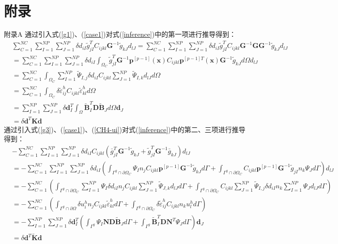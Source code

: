 \chapter{附录}
附录A
通过引入式(\ref{g1})、(\ref{case1})对式(\ref{inference})中的第一项进行推导得到：
\begin{equation}\label{CH4-K}
\begin{split}
    &\sum_{C=1}^{N\!C}\sum_{I=1}^{N\!P}\sum_{J=1}^{N\!P}\delta d_{iI}\tilde{g}^T_{jI}C_{ijkl}\pmb{G}^{-1}\tilde{g}_{kJ}d_{lJ}=\sum_{C=1}^{N\!C}\sum_{I=1}^{N\!P}\sum_{J=1}^{N\!P}\delta d_{iI}\tilde{g}^T_{jI}C_{ijkl}\pmb{G}^{-1}\pmb{G}\pmb{G}^{-1}\tilde{g}_{kJ}d_{lJ}\\
&=\sum_{C=1}^{N\!C}\sum_{I=1}^{N\!P}\sum_{J=1}^{N\!P}\delta d_{iI}\int_{\Omega_C}\tilde{g}_{jI}^T\pmb{G}^{-1}\pmb{p}^{[p-1]}(\pmb x)C_{ijkl}\pmb{p}^{[p-1]T}(\pmb{x})\pmb{G}^{-1}\tilde{g}_{kJ}d\Omega d_{lJ}\\
&=\sum_{C=1}^{N\!C}\int_{\Omega_C}\sum_{I=1}^{N\!P}\tilde{\Psi}_{I,j}\delta d_{iI}C_{ijkl}\sum_{J=1}^{N\!P}\tilde{\Psi}_{I,k}d_{lJ}d\Omega\\
&=\sum_{C=1}^{N\!C}\int_{\Omega_C}\delta\tilde{\varepsilon}_{ij}^hC_{ijkl}\tilde{\varepsilon}_{kl}^hd\Omega\\
&=\sum_{I=1}^{N\!P}\sum_{J=1}^{N\!P}\delta\pmb{d}^T_I\int_{\Omega}\tilde{\pmb{B}}_I^T\pmb{D}\tilde{\pmb{B}}_Jd\Omega\pmb{d}_J\\
&=\delta\pmb{d}^T\pmb{K}\pmb{d}
\end{split}
\end{equation}
通过引入式(\ref{g3})、(\ref{case1})、(\ref{CH4-ui})对式(\ref{inference})中的第二、三项进行推导得到：
\begin{equation}\label{CH4-tildeK}
\begin{split}
    &-\sum_{C=1}^{N\!C}\sum_{I=1}^{N\!P}\sum_{J=1}^{N\!P}\delta d_{iI}C_{ijkl}(\bar{g}_{jI}^T\pmb{G}^{-1}\tilde{g}_{kJ}+\tilde{g}_{jI}^T\pmb{G}^{-1}\bar{g}_{kJ})d_{lJ}\\
    &=-\sum_{C=1}^{N\!C}\sum_{I=1}^{N\!P}\sum_{J=1}^{N\!P}\delta d_{iI}(\int_{\Gamma^g\cap\partial\Omega_C}\Psi_In_jC_{ijkl}\pmb{p}^{[p-1]}\pmb{G}^{-1}\tilde{g}_{kJ}d\Gamma+\int_{\Gamma^g\cap\partial\Omega_C}C_{ijkl}\pmb{p}^{[p-1]}\pmb{G}^{-1}\tilde{g}_{jI}n_k\Psi_Jd\Gamma)d_{lJ}\\
    &=-\sum_{C=1}^{N\!C}(\int_{\Gamma^g\cap\partial\Omega_C}\sum_{I=1}^{N\!P}\Psi_I\delta d_{iI}n_jC_{ijkl}\sum_{J=1}^{N\!P}\tilde{\Psi}_{J,k}d_{lJ}d\Gamma+\int_{\Gamma^g\cap\partial\Omega_C}C_{ijkl}\sum_{J=1}^{N\!P}\tilde{\Psi}_{I,j}\delta d_{iI}n_k\sum_{I=1}^{N\!P}\Psi_Jd_{lJ}d\Gamma)\\
    &=-\sum_{C=1}^{N\!C}(\int_{\Gamma^g\cap\partial\Omega}\delta u_i^hn_jC_{ijkl}\tilde{\varepsilon}_{kl}^hd\Gamma+\int_{\Gamma^g\cap\partial\Omega_C}\delta\tilde{\varepsilon}_{ij}^hC_{ijkl}n_ku^h_ld\Gamma)\\
    &=-\sum_{I=1}^{N\!P}\sum_{J=1}^{N\!P}\delta\pmb{d}_I^T(\int_{\Gamma^g}\Psi_I\pmb{N}\pmb{D}\tilde{\pmb{B}}_Jd\Gamma+\int_{\Gamma^g}\tilde{\pmb{B}}_I^T\pmb{D}\pmb{N}^T\Psi_Jd\Gamma)\pmb d_J\\
    &=\delta\pmb{d}^T\tilde{\pmb{K}}\pmb{d}
\end{split}
\end{equation}
